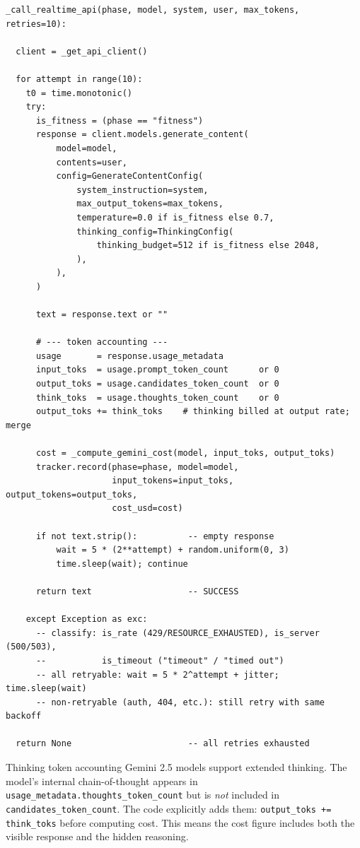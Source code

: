 \documentclass[11pt,a4paper]{report}
\newcommand{\fn}[1]{\texttt{#1}}
\begin{document}
\begin{lstlisting}[style=chain]
_call_realtime_api(phase, model, system, user, max_tokens, retries=10):

  client = _get_api_client()

  for attempt in range(10):
    t0 = time.monotonic()
    try:
      is_fitness = (phase == "fitness")
      response = client.models.generate_content(
          model=model,
          contents=user,
          config=GenerateContentConfig(
              system_instruction=system,
              max_output_tokens=max_tokens,
              temperature=0.0 if is_fitness else 0.7,
              thinking_config=ThinkingConfig(
                  thinking_budget=512 if is_fitness else 2048,
              ),
          ),
      )

      text = response.text or ""

      # --- token accounting ---
      usage       = response.usage_metadata
      input_toks  = usage.prompt_token_count      or 0
      output_toks = usage.candidates_token_count  or 0
      think_toks  = usage.thoughts_token_count    or 0
      output_toks += think_toks    # thinking billed at output rate; merge

      cost = _compute_gemini_cost(model, input_toks, output_toks)
      tracker.record(phase=phase, model=model,
                     input_tokens=input_toks, output_tokens=output_toks,
                     cost_usd=cost)

      if not text.strip():          -- empty response
          wait = 5 * (2**attempt) + random.uniform(0, 3)
          time.sleep(wait); continue

      return text                   -- SUCCESS

    except Exception as exc:
      -- classify: is_rate (429/RESOURCE_EXHAUSTED), is_server (500/503),
      --           is_timeout ("timeout" / "timed out")
      -- all retryable: wait = 5 * 2^attempt + jitter; time.sleep(wait)
      -- non-retryable (auth, 404, etc.): still retry with same backoff

  return None                       -- all retries exhausted
\end{lstlisting}

\begin{conceptbox}{Thinking token accounting}
Gemini 2.5 models support extended thinking.  The model's internal chain-of-thought
appears in \fn{usage\_metadata.thoughts\_token\_count} but is \emph{not} included in
\fn{candidates\_token\_count}.  The code explicitly adds them:
\fn{output\_toks += think\_toks} before computing cost.  This means the cost figure
includes both the visible response and the hidden reasoning.
\end{conceptbox}
\end{document}
